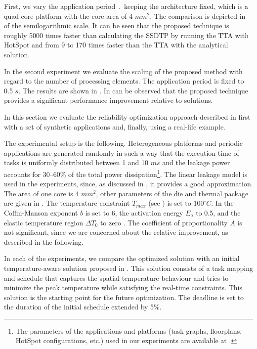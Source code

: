First, we vary the application period $\period$ keeping the architecture fixed, which is a quad-core platform with the core area of 4 $mm^2$. The comparison is depicted in  of the semilogarithmic scale. It can be seen that the proposed technique is roughly 5000 times faster than calculating the SSDTP by running the TTA with HotSpot and from 9 to 170 times faster than the TTA with the analytical solution.

In the second experiment we evaluate the scaling of the proposed method with regard to the number of processing elements. The application period is fixed to 0.5 $s$. The results are shown in . In can be observed that the proposed technique provides a significant performance improvement relative to  solutions.

 \label{sec:reliability-results}
In this section we evaluate the reliability optimization approach described in  first with a set of synthetic applications and, finally, using a real-life example.

The experimental setup is the following. Heterogeneous platforms and periodic applications are generated randomly \cite{dick1998} in such a way that the execution time of tasks is uniformly distributed between 1 and 10 $ms$ and the leakage power accounts for 30--60\% of the total power dissipation\footnote{The parameters of the applications and platforms (task graphs, floorplans, HotSpot configurations, etc.) used in our experiments are available at \cite{liu2011}.}. The linear leakage model is used in the experiments, since, as discussed in , it provides a good approximation. The area of one core is 4 $mm^2$, other parameters of the die and thermal package are given in . The temperature constraint $T_{max}$ (see ) is set to $100^\circ C$. In  the Coffin-Manson exponent $b$ is set to 6, the activation energy $E_a$ to 0.5, and the elastic temperature region $\Delta T_0$ to zero \cite{jedec2010}. The coefficient of proportionality $A$ is not significant, since we are concerned about the relative improvement, as described in the following.

In each of the experiments, we compare the optimized solution with an initial temperature-aware solution proposed in \cite{xie2006}. This solution consists of a task mapping and schedule that captures the spatial temperature behaviour and tries to minimize the peak temperature while satisfying the real-time constraints. This solution is the starting point for the future optimization. The deadline is set to the duration of the initial schedule extended by 5\%.

